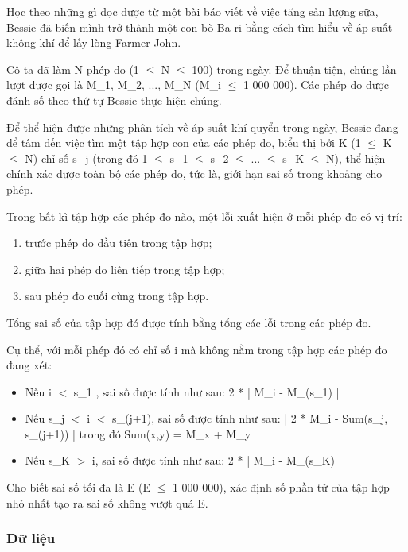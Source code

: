 



   Học theo những gì đọc được từ một bài báo viết về việc tăng sản lượng sữa, Bessie đã biến mình trở thành một con bò Ba-ri bằng cách tìm hiểu về áp suất không khí để lấy lòng Farmer John.  

   Cô ta đã làm N phép đo (1  $\le$  N  $\le$  100) trong ngày. Để thuận tiện, chúng lần lượt được gọi là M\_1, M\_2, ..., M\_N (M\_i  $\le$  1 000 000). Các phép đo được đánh số theo thứ tự Bessie thực hiện chúng.  

   Để thể hiện được những phân tích về áp suất khí quyển trong ngày, Bessie đang để tâm đến việc tìm một tập hợp con của các phép đo, biểu thị bởi K (1  $\le$  K  $\le$  N) chỉ số s\_j (trong đó 1  $\le$  s\_1  $\le$  s\_2  $\le$  ...  $\le$  s\_K  $\le$  N), thể hiện chính xác được toàn bộ các phép đo, tức là, giới hạn sai số trong khoảng cho phép.  

   Trong bất kì tập hợp các phép đo nào, một lỗi xuất hiện ở mỗi phép đo có vị trí:  
\begin{enumerate}
	\item     trước phép đo đầu tiên trong tập hợp;   
	\item     giữa hai phép đo liên tiếp trong tập hợp;   
	\item     sau phép đo cuối cùng trong tập hợp.   
\end{enumerate}

   Tổng sai số của tập hợp đó được tính bằng tổng các lỗi trong các phép đo.  

   Cụ thể, với mỗi phép đó có chỉ số i mà không nằm trong tập hợp các phép đo đang xét:  
\begin{itemize}
	\item     Nếu i $<$ s\_1 , sai số được tính như sau: 2 * | M\_i - M\_(s\_1) |   
	\item     Nếu s\_j $<$ i $<$ s\_(j+1), sai số được tính như sau: | 2 * M\_i - Sum(s\_j, s\_(j+1)) |      trong đó Sum(x,y) = M\_x + M\_y   
	\item     Nếu s\_K $>$ i, sai số được tính như sau: 2 * | M\_i - M\_(s\_K) |   
\end{itemize}

   Cho biết sai số tối đa là E (E  $\le$  1 000 000), xác định số phần tử của tập hợp nhỏ nhất tạo ra sai số không vượt quá E.  

\subsubsection{   Dữ liệu  }

